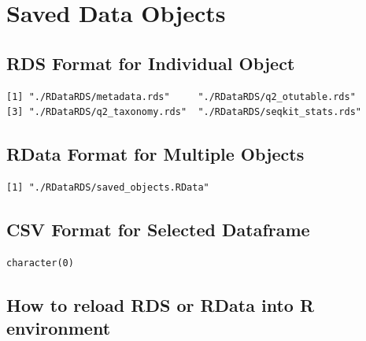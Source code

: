 \documentclass[
  12pt,
  openany]{book}
\begin{document}
\hypertarget{appendix-appendix}{%
\appendix}


\hypertarget{saved-data-objects}{%
\chapter{Saved Data Objects}\label{saved-data-objects}}

\hypertarget{rds-format-for-individual-object}{%
\section{RDS Format for Individual Object}\label{rds-format-for-individual-object}}

\begin{verbatim}
[1] "./RDataRDS/metadata.rds"     "./RDataRDS/q2_otutable.rds" 
[3] "./RDataRDS/q2_taxonomy.rds"  "./RDataRDS/seqkit_stats.rds"
\end{verbatim}

\hypertarget{rdata-format-for-multiple-objects}{%
\section{RData Format for Multiple Objects}\label{rdata-format-for-multiple-objects}}

\begin{verbatim}
[1] "./RDataRDS/saved_objects.RData"
\end{verbatim}

\hypertarget{csv-format-for-selected-dataframe}{%
\section{CSV Format for Selected Dataframe}\label{csv-format-for-selected-dataframe}}

\begin{verbatim}
character(0)
\end{verbatim}

\hypertarget{how-to-reload-rds-or-rdata-into-r-environment}{%
\section{How to reload RDS or RData into R environment}\label{how-to-reload-rds-or-rdata-into-r-environment}}
\end{document}
